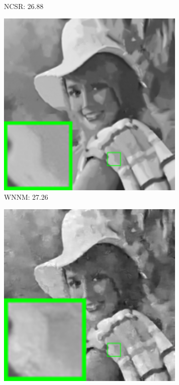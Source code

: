 \begin{figure}
\begin{adjustwidth}{-2cm}{}
\begin{subfigure}[t]{0.19\textwidth}
		\caption{NCSR: 26.88}
    \end{subfigure}
    \hfill
    \begin{subfigure}[t]{0.19\textwidth}
        \centering
        \includegraphics[width=1\textwidth]{images/twsc/awgn/resize_br_WNNM_80_elaine.png}
		\caption{WNNM: 27.26}
    \end{subfigure}
    \hfill
    \begin{subfigure}[t]{0.19\textwidth}
        \centering
        \includegraphics[width=1\textwidth]{images/twsc/awgn/resize_br_TNRD_80_elaine.png}

\end{subfigure}
\end{adjustwidth}
\end{figure}

